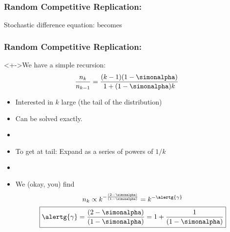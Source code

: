 \begin{frame}
  \frametitle{Random Competitive Replication:}

  \begin{block}{Stochastic difference equation:}
    becomes
  \end{block}

\end{frame}


\begin{frame}
  \frametitle{Random Competitive Replication:}

  \begin{block}<+->{We have a simple recursion:}
    $$  \frac{n_k}{n_{k-1}}
    =
    \frac{(k-1)(1-\simonalpha)}
    {1+(1-\simonalpha)k}
    $$
    
    \begin{itemize}
    \item<+-> 
      Interested in $k$ large (the tail of the distribution)
    \item<+->
      Can be solved exactly.
    \item<+->[]
    \item<+->
      To get at tail: Expand as a series of powers of $1/k$
    \item<+->[]
    \item<+->[]
      We (okay, you) find
      $$
      n_k \propto k^{-\frac{(2-\simonalpha)}{(1-\simonalpha)}}  = k^{-\alertg{\gamma}}
      $$
      $$
      \boxed{
        \alertg{\gamma} = \frac{(2-\simonalpha)}{(1-\simonalpha)} = 1 + \frac{1}{(1-\simonalpha)}
      }
      $$
    \end{itemize}
  \end{block}

\end{frame}

